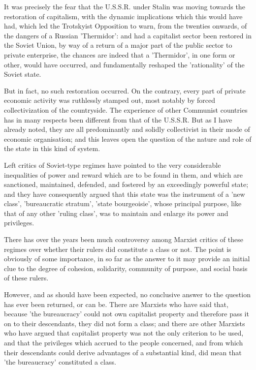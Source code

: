 It was precisely the fear that the U.S.S.R. under Stalin was moving towards the restoration of capitalism, with the dynamic implications which this would have had, which led the Trotskyist Opposition to warn, from the twenties onwards, of the dangers of a Russian 'Thermidor': and had a capitalist sector been restored in the Soviet Union, by way of a return of a major part of the public sector to private enterprise, the chances are indeed that a 'Thermidor', in one form or other, would have occurred, and fundamentally reshaped the 'rationality' of the Soviet state.

But in fact, no such restoration occurred. On the contrary, every part of private economic activity was ruthlessly stamped out, most notably by forced collectivization of the countryside. The experience of other Communist countries has in many respects been different from that of the U.S.S.R. But as I have already noted, they are all predominantly and solidly collectivist in their mode of economic organisation; and this leaves open the question of the nature and role of the state in this kind of system.

Left critics of Soviet-type regimes have pointed to the very considerable inequalities of power and reward which are to be found in them, and which are sanctioned, maintained, defended, and fostered by an exceedingly powerful state; and they have consequently argued that this state was the instrument of a 'new class', 'bureaucratic stratum', 'state bourgeoisie', whose principal purpose, like that of any other 'ruling class', was to maintain and enlarge its power and privileges.

There has over the years been much controversy among Marxist critics of these regimes over whether their rulers did constitute a class or not. The point is obviously of some importance, in so far as the answer to it may provide an initial clue to the degree of cohesion, solidarity, community of purpose, and social basis of these rulers.

However, and as should have been expected, no conclusive answer to the question has ever been returned, or can be. There are Marxists who have said that, because 'the bureaucracy' could not own capitalist property and therefore pass it on to their descendants, they did not form a class; and there are other Marxists who have argued that capitalist property was not the only criterion to be used, and that the privileges which accrued to the people concerned, and from which their descendants could derive advantages of a substantial kind, did mean that 'the bureaucracy' constituted a class.

